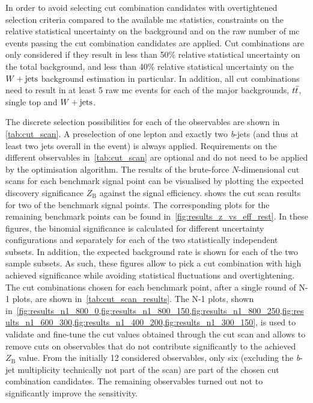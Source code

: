In order to avoid selecting cut combination candidates with overtightened selection criteria compared to the available \gls{mc} statistics, constraints on the relative statistical uncertainty on the background and on the raw number of \gls{mc} events passing the cut combination candidates are applied. Cut combinations are only considered if they result in less than 50\% relative statistical uncertainty on the total background, and less than 40\% relative statistical uncertainty on the $W+\mathrm{jets}$ background estimation in particular. In addition, all cut combinations need to result in at least 5 raw \gls{mc} events for each of the major backgrounds, $t\bar{t}$, single top and $W+\mathrm{jets}$.

The discrete selection possibilities for each of the observables are shown in \cref{tab:cut_scan}. A preselection of one lepton and exactly two \textit{b}-jets (and thus at least two jets overall in the event) is always applied. Requirements on the different observables in~\cref{tab:cut_scan} are optional and do not need to be applied by the optimisation algorithm. The results of the brute-force $N$-dimensional cut scans for each benchmark signal point can be visualised by plotting the expected discovery significance $Z_\mathrm{B}$ against the signal efficiency.  shows the cut scan results for two of the benchmark signal points. The corresponding plots for the remaining benchmark points can be found in~\cref{fig:results_z_vs_eff_rest}. In these figures, the binomial significance is calculated for different uncertainty configurations and separately for each of the two statistically independent subsets. In addition, the expected background rate is shown for each of the two sample subsets. As such, these figures allow to pick a cut combination with high achieved significance while avoiding statistical fluctuations and overtightening. The cut combinations chosen for each benchmark point, after a single round of N-1 plots, are shown in~\cref{tab:cut_scan_results}. The N-1 plots, shown in~\cref{fig:results_n1_800_0,fig:results_n1_800_150,fig:results_n1_800_250,fig:results_n1_600_300,fig:results_n1_400_200,fig:results_n1_300_150}, is used to validate and fine-tune the cut values obtained through the cut scan and allows to remove cuts on observables that do not contribute significantly to the achieved $Z_\mathrm{B}$ value. From the initially 12 considered observables, only six (excluding the \textit{b}-jet multiplicity technically not part of the scan) are part of the chosen cut combination candidates. The remaining observables turned out not to significantly improve the sensitivity.


